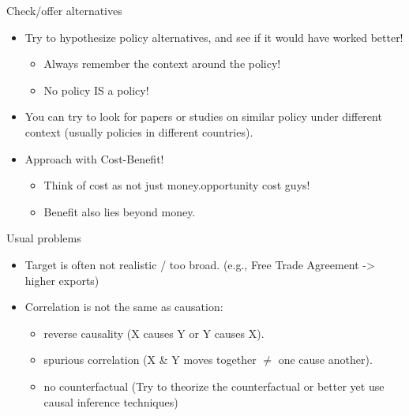 \documentclass[
  ignorenonframetext,
]{beamer}
\begin{document}
\begin{frame}{Check/offer alternatives}
\protect\hypertarget{checkoffer-alternatives}{}
\begin{itemize}
\item
  Try to hypothesize policy alternatives, and see if it would have
  worked better!

  \begin{itemize}
  \item
    Always remember the context around the policy!
  \item
    No policy IS a policy!
  \end{itemize}
\item
  You can try to look for papers or studies on similar policy under
  different context (usually policies in different countries).
\item
  Approach with Cost-Benefit!

  \begin{itemize}
  \item
    Think of cost as not just money.opportunity cost guys!
  \item
    Benefit also lies beyond money.
  \end{itemize}
\end{itemize}
\end{frame}

\begin{frame}{Usual problems}
\protect\hypertarget{usual-problems}{}
\begin{itemize}
\item
  Target is often not realistic / too broad. (e.g., Free Trade Agreement
  -\textgreater{} higher exports)
\item
  Correlation is not the same as causation:

  \begin{itemize}
  \item
    reverse causality (X causes Y or Y causes X).
  \item
    spurious correlation (X \& Y moves together \(\neq\) one cause
    another).
  \item
    no counterfactual (Try to theorize the counterfactual or better yet
    use causal inference techniques)
  \end{itemize}
\end{itemize}
\end{frame}
\end{document}
